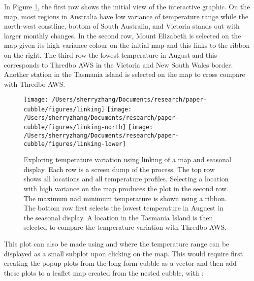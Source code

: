 \documentclass[
]{jss}
\begin{document}
In Figure \ref{fig:interactive-linking}, the first row shows the initial
view of the interactive graphic. On the map, most regions in Australia
have low variance of temperature range while the north-west coastline,
bottom of South Australia, and Victoria stands out with larger monthly
changes. In the second row, Mount Elizabeth is selected on the map given
its high variance colour on the initial map and this links to the ribbon
on the right. The third row the lowest temperature in August and this
corresponds to Thredbo AWS in the Victoria and New South Wales border.
Another station in the Tasmania island is selected on the map to cross
compare with Thredbo AWS.

\begin{CodeChunk}
\begin{figure}

{\centering \texttt{[image: /Users/sherryzhang/Documents/research/paper-cubble/figures/linking]} \texttt{[image: /Users/sherryzhang/Documents/research/paper-cubble/figures/linking-north]} \texttt{[image: /Users/sherryzhang/Documents/research/paper-cubble/figures/linking-lower]} 

}

\caption[Exploring temperature variation using linking of a map and seasonal display]{Exploring temperature variation using linking of a map and seasonal display. Each row is a screen dump of the process. The top row shows all locations and all temperature profiles. Selecting a location with high variance on the map produces the plot in the second row. The maximum nad minimum temperature is shown using a ribbon. The bottom row first selects the lowest temperature in Auguest in the seasonal display. A location in the Tasmania Island is then selected to compare the temperature variation with Thredbo AWS.}\label{fig:interactive-linking}
\end{figure}
\end{CodeChunk}

This plot can also be made using  and  where
the temperature range can be displayed as a small subplot upon clicking
on the map. This would require first creating the popup plots from the
long form cubble as a vector and then add these plots to a leaflet map
created from the nested cubble, with :
\end{document}
